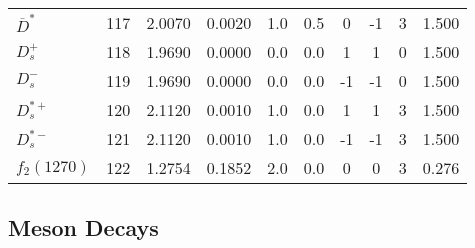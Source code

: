 \documentclass[a4paper,10pt]{article}
\begin{document}
\begin{tabular}{lrcccccccc}
$\overline{D}^*$  & 117 & 2.0070 & 0.0020 &  1.0 &  0.5 &  0 & -1 &  3& 1.500\\
$D_s^+         $  & 118 & 1.9690 & 0.0000 &  0.0 &  0.0 &  1 &  1 &  0& 1.500\\
$D_s^-         $  & 119 & 1.9690 & 0.0000 &  0.0 &  0.0 & -1 & -1 &  0& 1.500\\
$D_s^{*+}      $  & 120 & 2.1120 & 0.0010 &  1.0 &  0.0 &  1 &  1 &  3& 1.500\\
$D_s^{*-}      $  & 121 & 2.1120 & 0.0010 &  1.0 &  0.0 & -1 & -1 &  3& 1.500\\
\midrule
$f_2(1270)     $  & 122 & 1.2754 & 0.1852 &  2.0 &  0.0 &  0 &  0 &  3& 0.276\\
\bottomrule
\end{tabular}

\subsection{Meson Decays}
\end{document}
